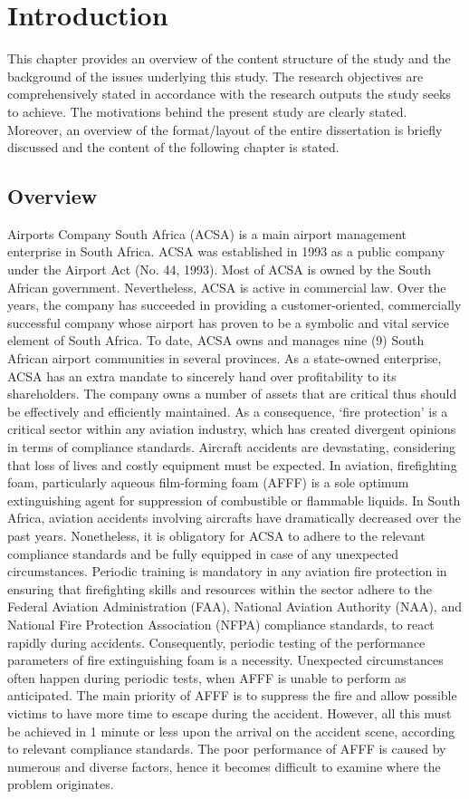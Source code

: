 \chapter{Introduction}
This chapter provides an overview of the content structure of the study and the background of the issues underlying this study. The research objectives are comprehensively stated in accordance with the research outputs the study seeks to achieve. The motivations behind the present study are clearly stated. Moreover, an overview of the format/layout of the entire dissertation is briefly discussed and the content of the following chapter is stated. 

\section{Overview}
Airports Company South Africa (ACSA) is a main airport management enterprise in South Africa. ACSA was established in 1993 as a public company under the Airport Act (No. 44, 1993). Most of ACSA is owned by the South African government. Nevertheless, ACSA is active in commercial law. Over the years, the company has succeeded in providing a customer-oriented, commercially successful company whose airport has proven to be a symbolic and vital service element of South Africa. To date, ACSA owns and manages nine (9) South African airport communities in several provinces. As a state-owned enterprise, ACSA has an extra mandate to sincerely hand over profitability to its shareholders.
The company owns a number of assets that are critical thus should be effectively and efficiently maintained. As a consequence, ‘fire protection’ is a critical sector within any aviation industry, which has created divergent opinions in terms of compliance standards. Aircraft accidents are devastating, considering that loss of lives and costly equipment must be expected. In aviation, firefighting foam, particularly aqueous film-forming foam (AFFF) is a sole optimum extinguishing agent for suppression of combustible or flammable liquids. In South Africa, aviation accidents involving aircrafts have dramatically decreased over the past years. Nonetheless, it is obligatory for ACSA to adhere to the relevant compliance standards and be fully equipped in case of any unexpected circumstances.
Periodic training is mandatory in any aviation fire protection in ensuring that firefighting skills and resources within the sector adhere to the Federal Aviation Administration (FAA), National Aviation Authority (NAA), and National Fire Protection Association (NFPA) compliance standards, to react rapidly during accidents. Consequently, periodic testing of the performance parameters of fire extinguishing foam is a necessity. Unexpected circumstances often happen during periodic tests, when AFFF is unable to perform as anticipated. The main priority of AFFF is to suppress the fire and allow possible victims to have more time to escape during the accident. However, all this must be achieved in 1 minute or less upon the arrival on the accident scene, according to relevant compliance standards. The poor performance of AFFF is caused by numerous and diverse factors, hence it becomes difficult to examine where the problem originates.
